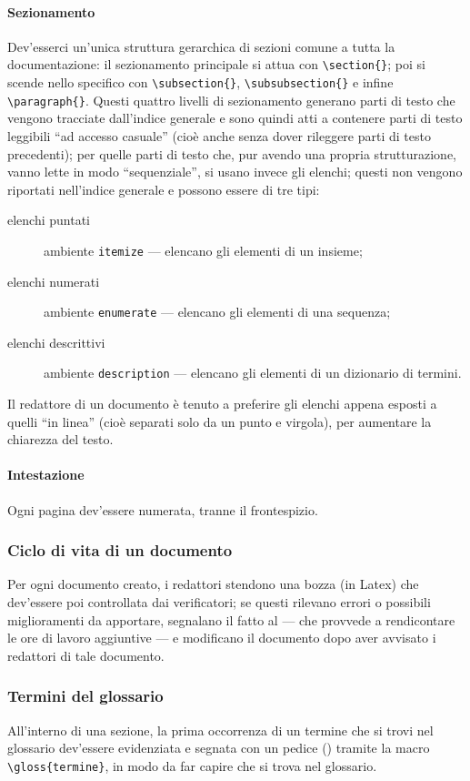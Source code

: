 \paragraph{Sezionamento} Dev'esserci un'unica struttura gerarchica di sezioni comune a tutta la documentazione: il sezionamento principale si attua con \texttt{\textbackslash section\{\}}; poi si scende nello specifico con \texttt{\textbackslash subsection\{\}}, \texttt{\textbackslash subsubsection\{\}} e infine \texttt{\textbackslash paragraph\{\}}. Questi quattro livelli di sezionamento generano parti di testo che vengono tracciate dall'indice generale e sono quindi atti a contenere parti di testo leggibili “ad accesso casuale” (cioè anche senza dover rileggere parti di testo precedenti); per quelle parti di testo che, pur avendo una propria strutturazione, vanno lette in modo “sequenziale”, si usano invece gli elenchi; questi non vengono riportati nell'indice generale e possono essere di tre tipi:
\begin{description}
	\item[elenchi puntati] ambiente \texttt{itemize} --- elencano gli elementi di un insieme;
	\item[elenchi numerati] ambiente \texttt{enumerate} --- elencano gli elementi di una sequenza;
	\item[elenchi descrittivi] ambiente \texttt{description} --- elencano gli elementi di un dizionario di termini.
\end{description}
Il redattore di un documento è tenuto a preferire gli elenchi appena esposti a quelli “in linea” (cioè separati solo da un punto e virgola), per aumentare la chiarezza del testo.
\paragraph{Intestazione} Ogni pagina dev'essere numerata, tranne il frontespizio.

\subsubsection{Ciclo di vita di un documento} Per ogni documento creato, i redattori stendono una bozza (in Latex) che dev'essere poi controllata dai verificatori; se questi rilevano errori o possibili miglioramenti da apportare, segnalano il fatto al  --- che provvede a rendicontare le ore di lavoro aggiuntive --- e modificano il documento dopo aver avvisato i redattori di tale documento.

\subsubsection{Termini del glossario} All'interno di una sezione, la prima occorrenza di un termine che si trovi nel glossario dev'essere evidenziata e segnata con un pedice () tramite la macro \texttt{\textbackslash gloss\{termine\}}, in modo da far capire che si trova nel glossario.

